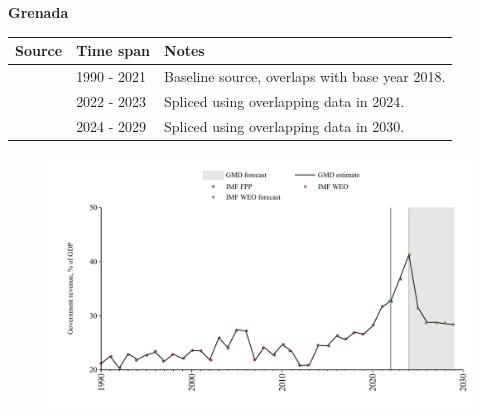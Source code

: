 \documentclass[12pt,a4paper,landscape]{article}
\begin{document}
\begin{adjustbox}{max totalsize={\paperwidth}{\paperheight},center}
\begin{minipage}[t][\textheight][t]{\textwidth}
\vspace*{0.5cm}
{}
\begin{center}
{\Large\bfseries Grenada}
\end{center}
\vspace{0.5cm}
\begin{table}[H]
\centering
\small
\begin{tabular}{|l|l|l|}
\hline
\textbf{Source} & \textbf{Time span} & \textbf{Notes} \\
\hline
\rowcolor{white}\cite{IMF_WEO}& 1990 - 2021 &Baseline source, overlaps with base year 2018.\\
\rowcolor{lightgray}\cite{IMF_FPP}& 2022 - 2023 &Spliced using overlapping data in 2024.\\
\rowcolor{white}\cite{IMF_WEO_forecast}& 2024 - 2029 &Spliced using overlapping data in 2030.\\
\hline
\end{tabular}
\end{table}
\begin{figure}[H]
\centering
\includegraphics[width=\textwidth,height=0.6\textheight,keepaspectratio]{graphs/GRD_govrev_GDP.pdf}
\end{figure}
\end{minipage}
\end{adjustbox}
\end{document}
